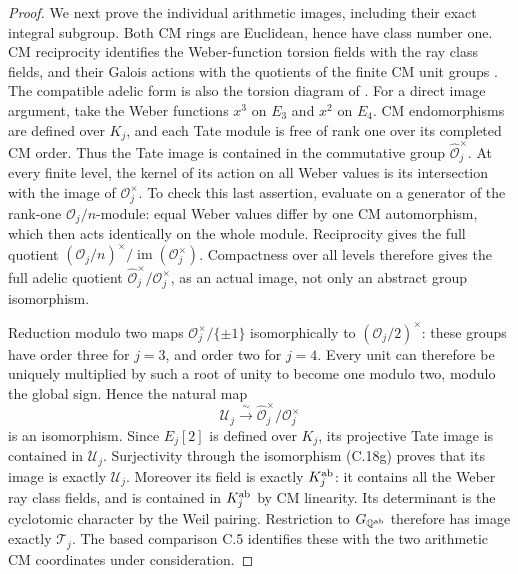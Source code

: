 \begin{proof}
We next prove the individual arithmetic images, including
their exact integral subgroup. Both CM rings are
Euclidean, hence have class number one. CM reciprocity
identifies the Weber-function torsion fields with the
ray class fields, and their Galois actions with the
quotients of the finite CM unit groups
\citep[Corollaries 3.4 and 3.7, Theorem 4.1]{cLozanoRobledo2022}.
The compatible adelic form is also the torsion diagram
of \citet[Theorem 3.10]{cMilne2007}.
For a direct image argument, take the Weber functions
\(x^3\) on \(E_3\) and \(x^2\) on \(E_4\).
CM endomorphisms are defined over \(K_j\), and each
Tate module is free of rank one over its completed CM
order. Thus the Tate image is contained in the
commutative group \(\widehat{\mathcal O}_j^{\times}\).
At every finite level, the kernel of its action on all
Weber values is its intersection with the image of
\(\mathcal O_j^{\times}\). To check this last assertion,
evaluate on a generator of the rank-one
\(\mathcal O_j/n\)-module: equal Weber values differ
by one CM automorphism, which then acts identically
on the whole module. Reciprocity gives the full
quotient \((\mathcal O_j/n)^\times/\operatorname{im}
(\mathcal O_j^\times)\). Compactness over all levels
therefore gives the full adelic quotient
\(\widehat{\mathcal O}_j^\times/\mathcal O_j^\times\),
as an actual image, not only an abstract group isomorphism.

Reduction modulo two maps
\(\mathcal O_j^\times/\{\pm1\}\) isomorphically to
\((\mathcal O_j/2)^\times\): these groups have order
three for \(j=3\), and order two for \(j=4\).
Every unit can therefore be uniquely multiplied by
such a root of unity to become one modulo two, modulo
the global sign. Hence the natural map
\[
 \mathcal U_j\xrightarrow{\ \sim\ }
       \widehat{\mathcal O}_j^\times/\mathcal O_j^\times
 \tag{C.18g}
\]
is an isomorphism. Since \(E_j[2]\) is defined over
\(K_j\), its projective Tate image is contained in
\(\mathcal U_j\). Surjectivity through the isomorphism
(C.18g) proves that its image is exactly \(\mathcal U_j\).
Moreover its field is exactly \(K_j^{\rm ab}\): it
contains all the Weber ray class fields, and is
contained in \(K_j^{\rm ab}\) by CM linearity.
Its determinant is the cyclotomic character by the
Weil pairing. Restriction to \(G_{\mathbb Q^{\rm ab}}\)
therefore has image exactly \(\mathcal T_j\).
The based comparison C.5 identifies these with the
two arithmetic CM coordinates under consideration.


\end{proof}
